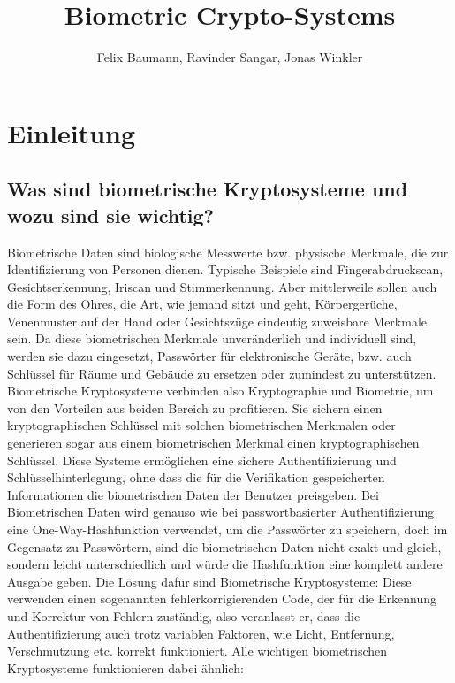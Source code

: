 \documentclass[12pt,a4paper]{article}
\author{Felix Baumann, Ravinder Sangar, Jonas Winkler}
\title{Biometric Crypto-Systems}
\begin{document}
\maketitle
\tableofcontents

\section{Einleitung}
\subsection{Was sind biometrische Kryptosysteme und wozu sind sie wichtig?}
Biometrische Daten sind biologische Messwerte bzw. physische Merkmale, die zur Identifizierung von Personen dienen. Typische Beispiele sind Fingerabdruckscan, Gesichtserkennung, Iriscan und Stimmerkennung. Aber mittlerweile sollen auch die Form des Ohres, die Art, wie jemand sitzt und geht, Körpergerüche, Venenmuster auf der Hand oder Gesichtszüge eindeutig zuweisbare Merkmale sein. 
Da diese biometrischen Merkmale unveränderlich und individuell sind, werden sie dazu eingesetzt, Passwörter für elektronische Geräte, bzw. auch Schlüssel für Räume und Gebäude zu ersetzen oder zumindest zu unterstützen. \newline
Biometrische Kryptosysteme verbinden also Kryptographie und Biometrie, um von den Vorteilen aus beiden Bereich zu profitieren. Sie sichern einen kryptographischen Schlüssel mit solchen biometrischen Merkmalen oder generieren sogar aus einem biometrischen Merkmal einen kryptographischen Schlüssel. Diese Systeme ermöglichen eine sichere Authentifizierung und Schlüsselhinterlegung, ohne dass die für die Verifikation gespeicherten Informationen die biometrischen Daten der Benutzer preisgeben. \newline
Bei Biometrischen Daten wird genauso wie bei passwortbasierter Authentifizierung eine One-Way-Hashfunktion verwendet, um die Passwörter zu speichern, doch im Gegensatz zu Passwörtern, sind die biometrischen Daten nicht exakt und gleich, sondern leicht unterschiedlich und würde die Hashfunktion eine komplett andere Ausgabe geben. Die Lösung dafür sind Biometrische Kryptosysteme: Diese verwenden einen sogenannten fehlerkorrigierenden Code, der für die Erkennung und Korrektur von Fehlern zuständig, also veranlasst er, dass die Authentifizierung auch trotz variablen Faktoren, wie Licht, Entfernung, Verschmutzung etc. korrekt funktioniert. \newline
Alle wichtigen biometrischen Kryptosysteme funktionieren dabei ähnlich: 
\end{document}
